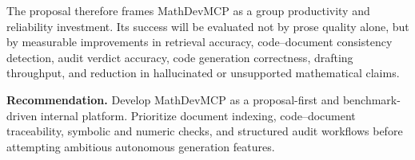 The proposal therefore frames MathDevMCP as a group productivity and reliability investment. Its success will be evaluated not by prose quality alone, but by measurable improvements in retrieval accuracy, code--document consistency detection, audit verdict accuracy, code generation correctness, drafting throughput, and reduction in hallucinated or unsupported mathematical claims.

\begin{proposalbox}
\textbf{Recommendation.} Develop MathDevMCP as a proposal-first and benchmark-driven internal platform. Prioritize document indexing, code--document traceability, symbolic and numeric checks, and structured audit workflows before attempting ambitious autonomous generation features.
\end{proposalbox}
